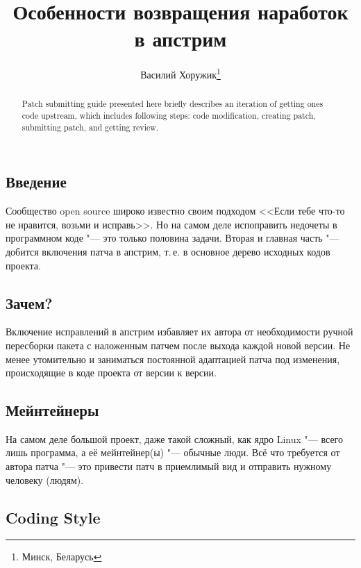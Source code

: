 \documentclass[10pt, a5paper]{article}
\begin{document}
\title{Особенности возвращения наработок в апстрим}%

\author{Василий Хоружик\footnote{Минск, Беларусь}}
\maketitle

\begin{abstract}
Patch submitting guide presented here briefly describes an iteration of getting ones code upstream, which includes following steps: code modification, creating patch, submitting patch, and getting review.
\end{abstract}

\subsection*{Введение}

Сообщество open source широко известно своим подходом <<Если тебе что-то не нравится, возьми и исправь>>. Но на самом деле испоправить недочеты в программном коде "--- это только половина задачи. Вторая и главная часть "--- добится включения патча в апстрим, т.\,е. в основное дерево исходных кодов проекта.

\subsection*{Зачем?}

Включение исправлений в апстрим избавляет их автора от необходимости ручной пересборки пакета с наложенным патчем после выхода каждой новой версии. Не менее утомительно и заниматься постоянной адаптацией патча под изменения, происходящие в коде проекта от версии к версии.

\subsection*{Мейнтейнеры}

На самом деле большой проект, даже такой сложный, как ядро Linux "--- всего лишь программа, а её мейнтейнер(ы) "--- обычные люди. Всё что требуется от автора патча "--- это привести патч в приемлимый вид и отправить нужному человеку (людям).

\subsection*{Coding Style}
\end{document}
